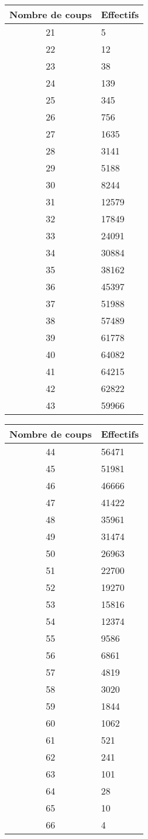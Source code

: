 \begin{center}
\begin{tabular}[t]{|c|l|}
\hline
Nombre de coups & Effectifs\\
\hline
21 & 5\\
\hline
22 & 12\\
\hline
23 & 38\\
\hline
24 & 139\\
\hline
25 & 345\\
\hline
26 & 756\\
\hline
27 & 1635\\
\hline
28 & 3141\\
\hline
29 & 5188\\
\hline
30 & 8244\\
\hline
31 & 12579\\
\hline
32 & 17849\\
\hline
33 & 24091\\
\hline
34 & 30884\\
\hline
35 & 38162\\
\hline
36 & 45397\\
\hline
37 & 51988\\
\hline
38 & 57489\\
\hline
39 & 61778\\
\hline
40 & 64082\\
\hline
41 & 64215\\
\hline
42 & 62822\\
\hline
43 & 59966\\
\hline
\end{tabular}\hspace{0.5cm}
\begin{tabular}[t]{|c|l|}
\hline
Nombre de coups & Effectifs\\
\hline
44 & 56471\\
\hline
45 & 51981\\
\hline
46 & 46666\\
\hline
47 & 41422\\
\hline
48 & 35961\\
\hline
49 & 31474\\
\hline
50 & 26963\\
\hline
51 & 22700\\
\hline
52 & 19270\\
\hline
53 & 15816\\
\hline
54 & 12374\\
\hline
55 & 9586\\
\hline
56 & 6861\\
\hline
57 & 4819\\
\hline
58 & 3020\\
\hline
59 & 1844\\
\hline
60 & 1062\\
\hline
61 & 521\\
\hline
62 & 241\\
\hline
63 & 101\\
\hline
64 & 28\\
\hline
65 & 10\\
\hline
66 & 4\\
\hline
\end{tabular}
\end{center}

